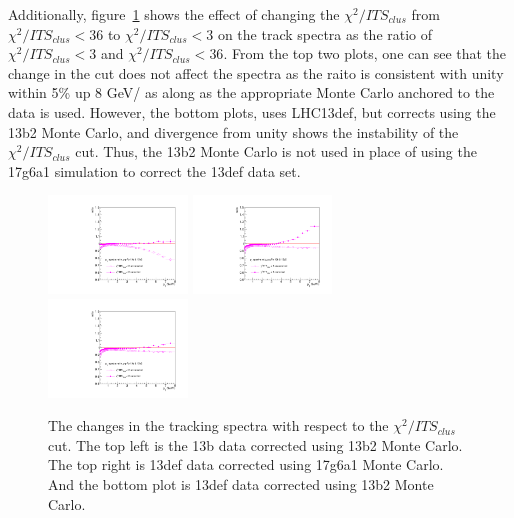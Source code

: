 Additionally, figure~\ref{fig:chi2SpectraComparison} shows the effect of changing the $\chi^2/ITS_{clus}$ from $\chi^2/ITS_{clus} < 36$ to $\chi^2/ITS_{clus} < 3$ on the track \pt spectra as the ratio of $\chi^2/ITS_{clus} <3$ and $\chi^2/ITS_{clus} < 36$. From the top two plots, one can see that the change in the cut does not affect the \pt spectra as the raito is consistent with unity within 5\% up 8 GeV/ as along as the appropriate Monte Carlo anchored to the data is used. However, the bottom plots, uses LHC13def, but corrects using the 13b2 Monte Carlo, and divergence from unity shows the instability of the $\chi^2/ITS_{clus}$ cut. Thus, the 13b2 Monte Carlo is not used in place of using the 17g6a1 simulation to correct the 13def data set.
\begin{figure}[h]
\center
\includegraphics[width=0.33\textwidth]{Checks_Systematics/ITSchi2_study_ptSpectra_ratio_MBMB.pdf}
\includegraphics[width=0.33\textwidth]{Checks_Systematics/ITSchi2_study_ptSpectra_ratio_MBGJ.pdf}
\includegraphics[width=0.33\textwidth]{Checks_Systematics/ITSchi2_study_ptSpectra_ratio_GJGJ.pdf}
\caption{The changes in the tracking spectra with respect to the $\chi^2/ITS_{clus}$ cut. The top left is the 13b data corrected using 13b2 Monte Carlo. The top right is 13def data corrected using 17g6a1 Monte Carlo. And the bottom plot is 13def data corrected using 13b2 Monte Carlo.}
\label{fig:chi2SpectraComparison}
\end{figure}

